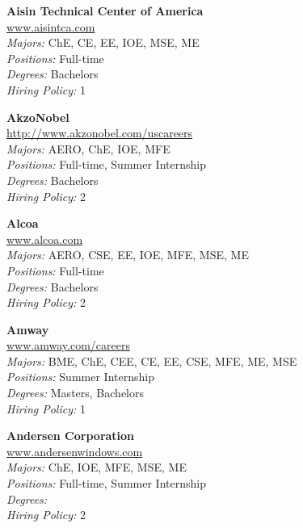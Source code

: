 \documentclass[twoside]{article}
\begin{document}
\begin{center}
\begin{multicols}{3}
\begin{minipage}{.9\columnwidth}{\Large\bf Aisin Technical Center of America }\\
	\url{www.aisintca.com}\\
	\emph{Majors:} ChE, CE, EE, IOE, MSE, ME\\
	\emph{Positions:} Full-time\\
	\emph{Degrees:} Bachelors\\
	\emph{Hiring Policy:} 1\\
\end{minipage}
 
\begin{minipage}{.9\columnwidth}{\Large\bf AkzoNobel }\\
	\url{http://www.akzonobel.com/uscareers}\\
	\emph{Majors:} AERO, ChE, IOE, MFE\\
	\emph{Positions:} Full-time, Summer Internship\\
	\emph{Degrees:} Bachelors\\
	\emph{Hiring Policy:} 2\\
\end{minipage}
 
\begin{minipage}{.9\columnwidth}{\Large\bf Alcoa }\\
	\url{www.alcoa.com}\\
	\emph{Majors:} AERO, CSE, EE, IOE, MFE, MSE, ME\\
	\emph{Positions:} Full-time\\
	\emph{Degrees:} Bachelors\\
	\emph{Hiring Policy:} 2\\
\end{minipage}
 
\begin{minipage}{.9\columnwidth}{\Large\bf Amway }\\
	\url{www.amway.com/careers}\\
	\emph{Majors:} BME, ChE, CEE, CE, EE, CSE, MFE, ME, MSE\\
	\emph{Positions:} Summer Internship\\
	\emph{Degrees:} Masters, Bachelors\\
	\emph{Hiring Policy:} 1\\
\end{minipage}
 
\begin{minipage}{.9\columnwidth}{\Large\bf Andersen Corporation }\\
	\url{www.andersenwindows.com}\\
	\emph{Majors:} ChE, IOE, MFE, MSE, ME\\
	\emph{Positions:} Full-time, Summer Internship\\
	\emph{Degrees:} \\
	\emph{Hiring Policy:} 2\\
\end{minipage}
 

\end{multicols}
\end{center}
\end{document}
